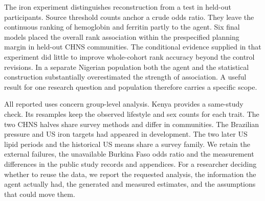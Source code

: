 \documentclass[sigconf,anonymous,review]{acmart}
\begin{document}
The iron experiment distinguishes reconstruction from a test in held-out participants. Source threshold counts anchor a crude odds ratio. They leave the continuous ranking of hemoglobin and ferritin partly to the agent. Six final models placed the overall rank association within the prespecified planning margin in held-out CHNS communities. The conditional evidence supplied in that experiment did little to improve whole-cohort rank accuracy beyond the control revisions. In a separate Nigerian population both the agent and the statistical construction substantially overestimated the strength of association. A useful result for one research question and population therefore carries a specific scope.

All reported uses concern group-level analysis. Kenya provides a same-study check. Its resamples keep the observed lifestyle and sex counts for each trait. The two CHNS halves share survey methods and differ in communities. The Brazilian pressure and US iron targets had appeared in development. The two later US lipid periods and the historical US means share a survey family. We retain the external failures, the unavailable Burkina Faso odds ratio and the measurement differences in the public study records and appendices. For a researcher deciding whether to reuse the data, we report the requested analysis, the information the agent actually had, the generated and measured estimates, and the assumptions that could move them.



\clearpage
\appendix

\end{document}
